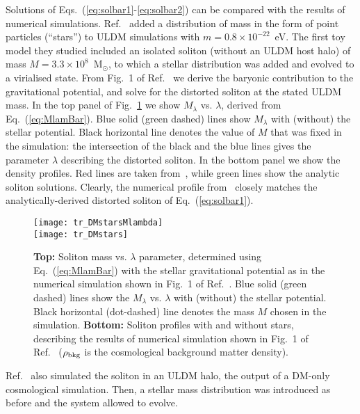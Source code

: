 \documentclass[aps,prd,floats,superscriptaddress,showpacs,nofootinbib,twocolumn,preprintnumbers]{revtex4-1}%
\begin{document}
Solutions of Eqs.~(\ref{eq:solbar1}-\ref{eq:solbar2}) can be compared
with the results of numerical simulations.  
% 
Ref.~\cite{2017arXiv171201947C} added a distribution of mass in the form of point particles (``stars'') to ULDM simulations 
with $m=0.8\times10^{-22}$~eV. 
The first toy model they studied included an isolated soliton (without
an ULDM host halo) of mass $M=3.3\times10^8$~M$_\odot$, to which a
stellar distribution was added and evolved to a virialised state.  
%
From Fig.~1 of Ref.~\cite{2017arXiv171201947C} we derive the baryonic
contribution to the gravitational potential, and solve for the
distorted soliton at the stated ULDM mass. In the top panel of
Fig.~\ref{fig:DMstarsMlambda} we show $M_\lambda$ vs. $\lambda$,
derived from Eq.~(\ref{eq:MlamBar}). Blue solid (green dashed) lines
show $M_\lambda$ with (without) the stellar potential. Black
horizontal line denotes the value of $M$ that was fixed in the
simulation: the intersection of the black and the blue lines gives the
parameter $\lambda$ describing the distorted soliton. In the bottom
panel we show the density profiles. Red lines are taken
from~\cite{2017arXiv171201947C}, while green lines show the analytic
soliton solutions. Clearly, the numerical profile
from~\cite{2017arXiv171201947C} closely matches the
analytically-derived distorted soliton of Eq.~(\ref{eq:solbar1}).  
%
\begin{figure}[hbp!]
\centering
\texttt{[image: tr\_DMstarsMlambda]}\\
\vspace{10pt}
\texttt{[image: tr\_DMstars]}
\caption{
{\bf Top:} Soliton mass vs. $\lambda$ parameter, determined using
Eq.~(\ref{eq:MlamBar}) with 
the stellar gravitational potential as in the numerical simulation
shown in Fig.~1 of Ref.~\cite{2017arXiv171201947C}. 
Blue solid (green dashed) lines show the
$M_\lambda$ vs. $\lambda$ with (without) the stellar
potential. Black horizontal (dot-dashed) 
line denotes the mass $M$ chosen in the
simulation. {\bf Bottom:} Soliton profiles with and without stars,
describing the results of numerical simulation shown in Fig.~1 of
Ref.~\cite{2017arXiv171201947C} ($\rho_{\rm bkg}$ is the cosmological background
matter density).  
}\label{fig:DMstarsMlambda}
\end{figure}
%

Ref.~\cite{2017arXiv171201947C} also simulated the
soliton in an ULDM halo, the output of a DM-only cosmological
simulation. Then, a stellar mass distribution was introduced as before
and the system allowed to evolve.  
\end{document}
